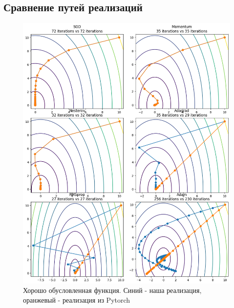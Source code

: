 \documentclass[a4paper,14pt,oneside,openany]{memoir}
\begin{document}
\subsection{Сравнение путей реализаций}
\begin{figure}[ht]
	\centering
	\includegraphics[width=1\textwidth]{img/4_1_1.png}
	\caption{Хорошо обусловленная функция. Синий - наша реализация, оранжевый - реализация из Pytorch}
\end{figure}
\end{document}
